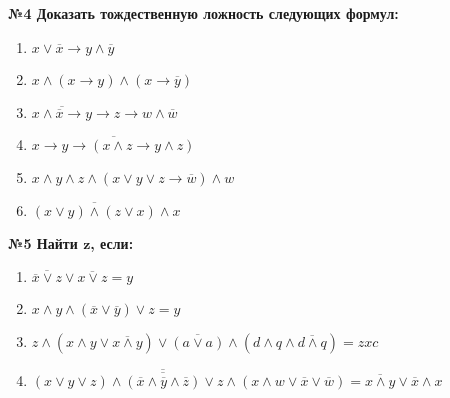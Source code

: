     \begin{center}
        \textbf{№4 Доказать тождественную ложность следующих формул:}
    \end{center}

    \begin{minipage}[t]{0.4\textwidth}
        \begin{enumerate}
            \item $x \vee \overline x \rightarrow y \wedge \overline y$
            \item $x \wedge (x \rightarrow y) \wedge (x \rightarrow  \overline y)$
            \item $\overline{x \wedge \overline x \rightarrow y } \rightarrow z \rightarrow w \wedge \overline w$
        \end{enumerate}
    \end{minipage}
    \begin{minipage}[t]{0.5\textwidth}
        \begin{enumerate}
            \setcounter{enumi}{3}
            \item $\overline{x \rightarrow y \rightarrow (x \wedge z \rightarrow y \wedge z)}$
            \item $x \wedge y \wedge z \wedge (x \vee y \vee z \rightarrow \overline w) \wedge w$
            \item $\overline{(x \vee y) \wedge (z \vee x)} \wedge x$
        \end{enumerate}
    \end{minipage}

    \begin{center}
        \textbf{№5 Найти $\textbf{z}$, если:}
    \end{center}

    \begin{minipage}[t]{0.9\textwidth}
        \begin{enumerate}
            \item $\overline{\overline x \vee z} \vee \overline{x \vee z} = y$
            \item $x \wedge y \wedge (\overline x \vee \overline y) \vee z = y$
            \item $z \wedge (x \wedge y \vee \overline{x \wedge y}) \vee \overline{(a \vee a)} \wedge (d \wedge q \wedge \overline{d \wedge q}) = zxc$
            \item $(x \vee y \vee z) \wedge \overline{\overline{(\overline x \wedge \overline y \wedge \overline z)}} \vee z \wedge (x \wedge w \vee \overline x \vee \overline w) = \overline{x \wedge y} \vee \overline x \wedge x$
        \end{enumerate}
    \end{minipage}

